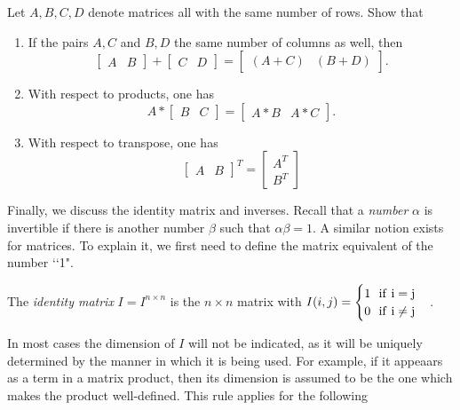 \documentclass[handout]{ximera}
\begin{document}
\begin{exercise} Let $A, B, C, D$ denote matrices all with the same number of rows. Show that
\begin{enumerate}
\item If the pairs $A,C$ and $B,D$ the same number of columns as well, then
\[
\begin{bmatrix} A & B\end{bmatrix} + \begin{bmatrix} C & D\end{bmatrix} = \begin{bmatrix} (A+C) & (B+D)\end{bmatrix}.
\]
\item With respect to products, one has
\[
A*\begin{bmatrix} B & C\end{bmatrix} = \begin{bmatrix} A*B & A*C\end{bmatrix}.
\]
\item With respect to transpose, one has
\[
\begin{bmatrix} A & B\end{bmatrix}^T = \begin{bmatrix} A^T \\ B^T\end{bmatrix}
\]
\end{enumerate}
\end{exercise}

Finally, we discuss the identity matrix and inverses. Recall that a {\it number} $\alpha$ is invertible if there is another number $\beta$ such that $\alpha\beta = 1$. A similar notion exists for matrices. To explain it, we first need to define the matrix equivalent of the number \lq\lq 1".

\begin{definition} The {\it identity matrix} $I = I^{n\times n}$ is the $n\times n$ matrix with $I(i,j) = \begin{cases}1\ \ \rm{if}\ i=j\\0\ \ \rm{if}\ i\ne j\end{cases}$.
\end{definition}

In most cases the dimension of $I$ will not be indicated, as it will be uniquely determined by the manner in which it is being used. For example, if it appeaars as a term in a matrix product, then its dimension is assumed to be the one which makes the product well-defined. This rule applies for the following 
\end{document}
